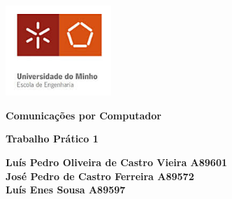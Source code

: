 \documentclass[11pt]{article}
\begin{document}
\begin{titlepage}
    \begin{center}
        \includegraphics[width=0.3\textwidth]{images/capa/EscolaEngenhariaUM.jpeg}
    
        \vspace{1cm}
        
        \textbf{\LARGE Comunicações por Computador}
    
        \vspace{0.5cm}
        \textbf{\Large Trabalho Prático 1}

        \vspace{1.3cm}
        
        \textbf{\large Luís Pedro Oliveira de Castro Vieira A89601 \\
        José Pedro de Castro Ferreira A89572 \\
        Luís Enes Sousa A89597}


\end{center}
\end{titlepage}
\end{document}
